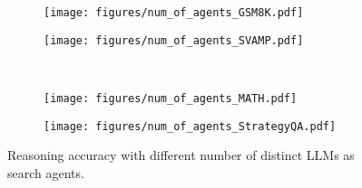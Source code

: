 \begin{figure}[t]
    \vskip 0.2in
    \centering
    \begin{subfigure}
        \centering
        \texttt{[image: figures/num\_of\_agents\_GSM8K.pdf]}
    \end{subfigure}%
    \hfill
    \begin{subfigure}
        \centering
        \texttt{[image: figures/num\_of\_agents\_SVAMP.pdf]}
    \end{subfigure}%
    \\
    \begin{subfigure}
        \centering
        \texttt{[image: figures/num\_of\_agents\_MATH.pdf]}
    \end{subfigure}%
    \hfill
    \begin{subfigure}
        \centering
        \texttt{[image: figures/num\_of\_agents\_StrategyQA.pdf]}
    \end{subfigure}%
    \vskip -0.1in
    \caption{
    Reasoning accuracy with different number of distinct LLMs as search agents.
    }
    \label{fig:num_of_agents}
    \vskip -0.2in
\end{figure}

